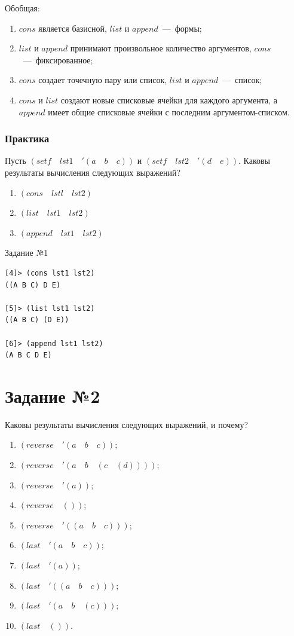 Обобщая: 
\begin{enumerate}
	\item $cons$ является базисной, $list$ и $append$~---~формы;
	\item $list$ и $append$ принимают произвольное количество аргументов, $cons$~---~фиксированное;
	\item $cons$ создает точечную пару или список, $list$ и $append$~---~список;
	\item $cons$ и $list$ создают новые списковые ячейки для каждого аргумента, а $append$ имеет общие списковые ячейки с последним аргументом-списком.
\end{enumerate}

\subsubsection{Практика}
Пусть $(setf \quad  lst1 \quad '(a \quad b \quad c))$ и $(setf \quad lst2 \quad '(d \quad e))$.
Каковы результаты вычисления следующих выражений?
\begin{enumerate}
	\item $(cons \quad lstl \quad lst2)$
	\item $(list \quad lst1 \quad lst2)$
	\item $(append \quad lst1 \quad lst2)$
\end{enumerate}
  
\begin{code}
\caption{Задание №1}
\label{code:bf2}
\begin{verbatim}
[4]> (cons lst1 lst2)
((A B C) D E)

[5]> (list lst1 lst2)
((A B C) (D E))

[6]> (append lst1 lst2)
(A B C D E)
\end{verbatim}
\end{code}

\section{Задание №2}
Каковы результаты вычисления следующих выражений, и почему?
\begin{enumerate}
	\item $(reverse \quad '(a \quad b \quad c))$;
	\item $(reverse \quad '(a \quad b \quad (c \quad (d))))$;
	\item $(reverse \quad '(a))$;
	\item $(reverse \quad ())$;
	\item $(reverse \quad '((a \quad b \quad c)))$;
	\item $(last \quad '(a \quad b \quad c))$;
	\item $(last \quad '(a))$;
	\item $(last \quad '((a \quad b \quad c)))$;
	\item $(last \quad '(a \quad b \quad (c)))$;
	\item $(last \quad ())$.
\end{enumerate}

